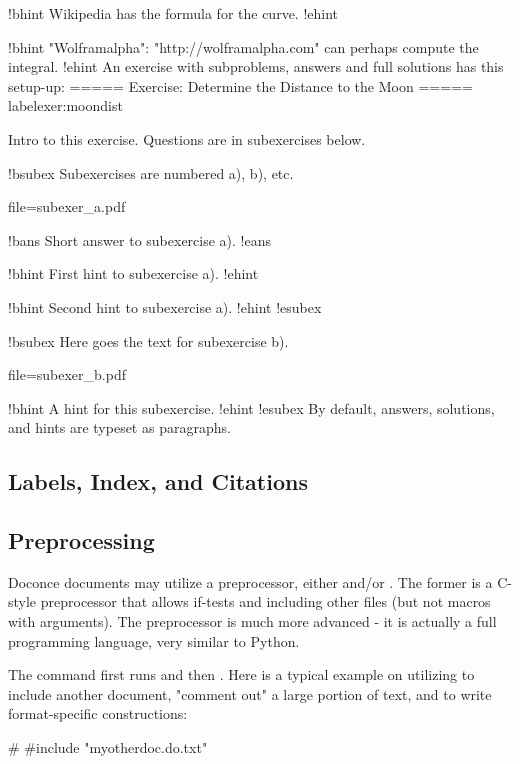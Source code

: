 \documentclass[twoside]{book}
\begin{document}
{!bhint
Wikipedia has the formula for the curve.
!ehint

!bhint
"Wolframalpha": "http://wolframalpha.com" can perhaps
compute the integral.
!ehint
\eccq
An exercise with subproblems, answers and full solutions has this
setup-up:
\bccq
===== Exercise: Determine the Distance to the Moon =====
label{exer:moondist}

Intro to this exercise. Questions are in subexercises below.

!bsubex
Subexercises are numbered a), b), etc.

file=subexer_a.pdf

!bans
Short answer to subexercise a).
!eans

!bhint
First hint to subexercise a).
!ehint

!bhint
Second hint to subexercise a).
!ehint
!esubex

!bsubex
Here goes the text for subexercise b).

file=subexer_b.pdf

!bhint
A hint for this subexercise.
!ehint
!esubex
\eccq
By default, answers, solutions, and hints are typeset as paragraphs.

\subsection{Labels, Index, and Citations}

\subsection{Preprocessing}

Doconce documents may utilize a preprocessor, either  and/or
. The former is a C-style preprocessor that allows if-tests
and including other files (but not macros with arguments).
The  preprocessor is much more advanced - it is actually a full
programming language, very similar to Python.

The command  first runs  and then .
Here is a typical example on utilizing  to include another
document, "comment out" a large portion of text, and to write format-specific
constructions:

\bccq
# #include "myotherdoc.do.txt"

}
\end{document}
